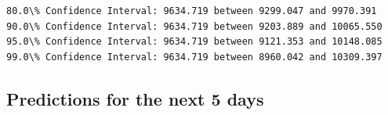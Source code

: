 \documentclass[11pt]{article}
\begin{document}
    \begin{Verbatim}[commandchars=\\\{\}]
80.0\% Confidence Interval: 9634.719 between 9299.047 and 9970.391
90.0\% Confidence Interval: 9634.719 between 9203.889 and 10065.550
95.0\% Confidence Interval: 9634.719 between 9121.353 and 10148.085
99.0\% Confidence Interval: 9634.719 between 8960.042 and 10309.397

    \end{Verbatim}

    \hypertarget{predictions-for-the-next-5-days}{%
\subsection{Predictions for the next 5
days}\label{predictions-for-the-next-5-days}}
\end{document}
